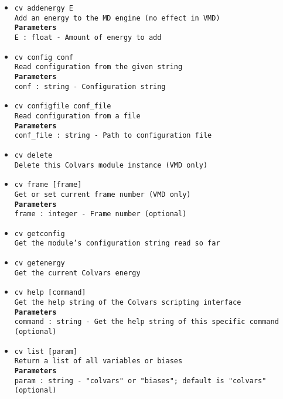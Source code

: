 \begin{itemize}
\item \texttt{cv addenergy E}
\\
\texttt{Add an energy to the MD engine (no effect in VMD)}
\\
\texttt{\textbf{Parameters}}
\\
\texttt{E : float - Amount of energy to add}
\item \texttt{cv config conf}
\\
\texttt{Read configuration from the given string}
\\
\texttt{\textbf{Parameters}}
\\
\texttt{conf : string - Configuration string}
\item \texttt{cv configfile conf\_file}
\\
\texttt{Read configuration from a file}
\\
\texttt{\textbf{Parameters}}
\\
\texttt{conf\_file : string - Path to configuration file}
\item \texttt{cv delete}
\\
\texttt{Delete this Colvars module instance (VMD only)}
\item \texttt{cv frame [frame]}
\\
\texttt{Get or set current frame number (VMD only)}
\\
\texttt{\textbf{Parameters}}
\\
\texttt{frame : integer - Frame number (optional)}
\item \texttt{cv getconfig}
\\
\texttt{Get the module's configuration string read so far}
\item \texttt{cv getenergy}
\\
\texttt{Get the current Colvars energy}
\item \texttt{cv help [command]}
\\
\texttt{Get the help string of the Colvars scripting interface}
\\
\texttt{\textbf{Parameters}}
\\
\texttt{command : string - Get the help string of this specific command (optional)}
\item \texttt{cv list [param]}
\\
\texttt{Return a list of all variables or biases}
\\
\texttt{\textbf{Parameters}}
\\
\texttt{param : string - "colvars" or "biases"; default is "colvars" (optional)}

\end{itemize}
